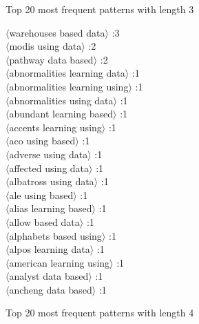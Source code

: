 \documentclass[11pt,a4paper,fleqn]{article}
\begin{document}
Top 20 most frequent patterns with length 3
\begin{multicols}{2} \noindent
$\langle$warehouses based data$\rangle$ :3\\
$\langle$modis using data$\rangle$ :2\\
$\langle$pathway data based$\rangle$ :2\\
$\langle$abnormalities learning data$\rangle$ :1\\
$\langle$abnormalities learning using$\rangle$ :1\\
$\langle$abnormalities using data$\rangle$ :1\\
$\langle$abundant learning based$\rangle$ :1\\
$\langle$accents learning using$\rangle$ :1\\
$\langle$aco using based$\rangle$ :1\\
$\langle$adverse using data$\rangle$ :1\\
$\langle$affected using data$\rangle$ :1\\
$\langle$albatross using data$\rangle$ :1\\
$\langle$ale using based$\rangle$ :1\\
$\langle$alias learning based$\rangle$ :1\\
$\langle$allow based data$\rangle$ :1\\
$\langle$alphabets based using$\rangle$ :1\\
$\langle$alpos learning data$\rangle$ :1\\
$\langle$american learning using$\rangle$ :1\\
$\langle$analyst data based$\rangle$ :1\\
$\langle$ancheng data based$\rangle$ :1\\
\end{multicols} \newpage \noindent
Top 20 most frequent patterns with length 4
\end{document}

